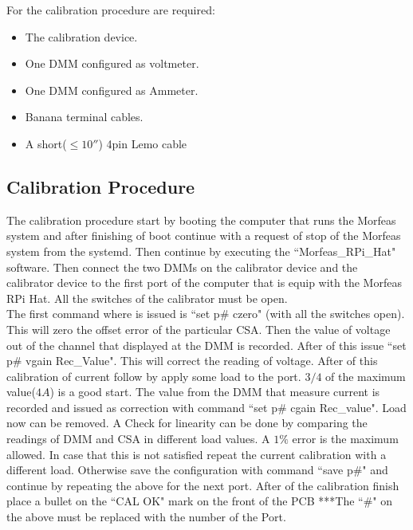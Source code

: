 For the calibration procedure are required:
\begin{itemize}
	\item The calibration device.
	\item One DMM configured as voltmeter.
	\item One DMM configured as Ammeter.
	\item Banana terminal cables.
	\item A short($\leq10''$) 4pin Lemo cable
\end{itemize}
\newpage
\subsection{Calibration Procedure}
The calibration procedure start by booting the computer that runs the Morfeas system and after finishing of boot continue with a request of stop of the Morfeas system from the systemd.
Then continue by executing the ``Morfeas\_RPi\_Hat" software. Then connect the two DMMs on the calibrator device and the calibrator device to the first port of the computer that is equip with the Morfeas RPi Hat.
All the switches of the calibrator must be open.\\
The first command where is issued is ``set p\# czero" (with all the switches open). This will zero the offset error of the particular CSA. Then the value of voltage out of the channel that displayed
at the DMM is recorded. After of this issue ``set p\# vgain Rec\_Value". This will correct the reading of voltage. After of this calibration of current follow by apply some load to the port.
$3/4$ of the maximum value($4A$) is a good start. The value from the DMM that measure current is recorded and issued as correction with command ``set p\# cgain Rec\_value".
Load now can be removed. A Check for linearity can be done by comparing the readings of DMM and CSA in different load values. A $1\%$ error is the maximum allowed.
In case that this is not satisfied repeat the current calibration with a different load. Otherwise save the configuration with command ``save p\#" and continue by repeating the above for the next port.
After of the calibration finish place a bullet on the ``CAL OK" mark on the front of the PCB
***The ``\#" on the above must be replaced with the number of the Port.\\

